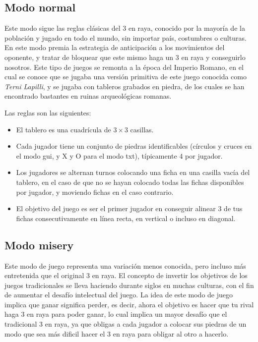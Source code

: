 \documentclass[a4paper,12pt]{article}
\begin{document}
\vspace{\baselineskip}
\subsection{Modo normal}
Este modo sigue las reglas clásicas del 3 en raya, conocido por la mayoría de la población y jugado en todo el mundo, sin importar 
país, costumbres o culturas. En este modo premia la estrategia de anticipación a los movimientos del oponente, y tratar de bloquear
que este mismo haga un 3 en raya y conseguirlo nosotros. Este tipo de juegos se remonta a la época del Imperio Romano, en el cual se 
conoce que se jugaba una versión primitiva de este juego conocida como \textit{Terni Lapilli}, y se jugaba con tableros grabados en piedra,
de los cuales se han encontrado bastantes en ruinas arqueológicas romanas.

\vspace{\baselineskip}
Las reglas son las siguientes:
\begin{itemize}
    \item El tablero es una cuadrícula de $3 \times 3$ casillas.
    \item Cada jugador tiene un conjunto de piedras identificables (círculos y cruces en el modo gui, y X y O para el modo txt), 
    típicamente 4 por jugador.
    \item Los jugadores se alternan turnos colocando una ficha en una casilla vacía del tablero, en el caso de que no se hayan colocado
    todas las fichas disponibles por jugador, y moviendo fichas en el caso contrario.
    \item El objetivo del juego es ser el primer jugador en conseguir alinear 3 de tus fichas consecutivamente en línea recta, en vertical
    o incluso en diagonal.
\end{itemize}

\subsection{Modo misery}
Este modo de juego representa una variación menos conocida, pero incluso más entretenida que el original 3 en raya. El concepto de invertir
los objetivos de los juegos tradicionales se lleva haciendo durante siglos en muchas culturas, con el fin de aumentar el desafío intelectual del juego.
La idea de este modo de juego implica que ganar significa perder, es decir, ahora el objetivo es hacer que tu rival haga 3 en raya para poder ganar, lo cual
implica un mayor desafío que el tradicional 3 en raya, ya que obligas a cada jugador a colocar sus piedras de un modo que sea más dificil hacer el 3 en raya 
para obligar al otro a hacerlo.
\end{document}

